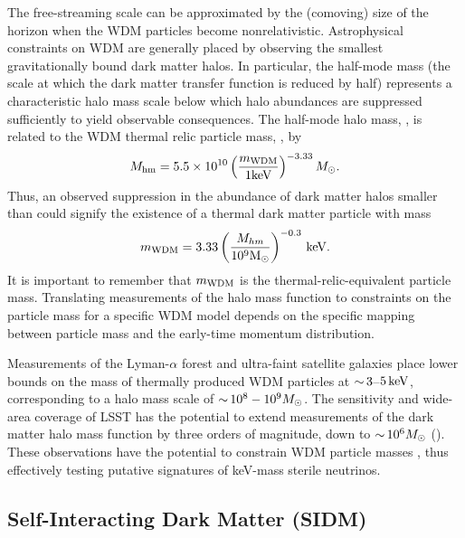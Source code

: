The free-streaming scale can be approximated by the (comoving) size of the horizon when the WDM particles become nonrelativistic.
Astrophysical constraints on WDM are generally placed by observing the smallest gravitationally bound dark matter halos.  
In particular, the half-mode mass (the scale at which the dark matter transfer function is reduced by half) represents a characteristic halo mass scale below which halo abundances are suppressed sufficiently to yield observable consequences. 
The half-mode halo mass, \Mhm, is related to the WDM thermal relic particle mass, \mWDM, by \citep[\eg][]{schneider2012,Bullock:2017}
\begin{equation} \label{eqn:Mhm}
    M_{\rm hm} = 5.5 \times 10^{10} \left( \frac{m_{\rm WDM}}{1 {\rm keV}} \right)^{-3.33} M_\odot.
\end{equation}
Thus, an observed suppression in the abundance of dark matter halos smaller than \Mhm could signify the existence of a thermal dark matter particle with mass
\begin{equation} \label{eqn:mWDM}
    m_{\rm WDM} =  3.33 \left(\frac{M_{hm}}{10^{9} {\rm M_\odot}} \right)^{-0.3} \mathrm{\,keV}.
\end{equation}
It is important to remember that $m_{\rm WDM}$ is the thermal-relic-equivalent particle mass. Translating measurements of the halo mass function to constraints on the particle mass for a specific WDM model depends on the specific mapping between particle mass and the early-time momentum distribution.

Measurements of the Lyman-$\alpha$ forest \citep[\eg][]{Viel:2013,2017PhRvD..96b3522I} and ultra-faint satellite galaxies \citep[\eg][]{Jethwa:2018,Kim:2017iwr} place lower bounds on the mass of thermally produced WDM particles at $ {\sim}\, 3$--$5\mathrm{\,keV}$, corresponding to a halo mass scale of $ {\sim}\, 10^8-10^9 M_\odot$.
The sensitivity and wide-area coverage of LSST has the potential to extend measurements of the dark matter halo mass function by three orders of magnitude, down to $ {\sim}\, 10^6 M_\odot$ (). 
These observations have the potential to constrain WDM particle masses , thus effectively testing putative signatures of keV-mass sterile neutrinos.


\subsection{Self-Interacting Dark Matter (SIDM)}
\label{sec:sidm}

